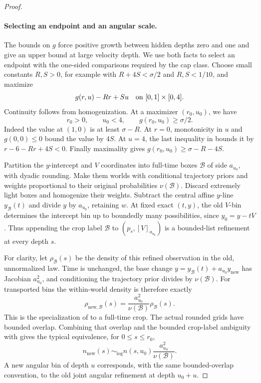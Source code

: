 \begin{proof}
\paragraph{Selecting an endpoint and an angular scale.}
The bounds on \(g\) force positive growth between hidden depths
zero and one and give an upper bound at large velocity depth.
We use both facts to select an endpoint with the one-sided
comparisons required by the cap class.
Choose small constants \(R,S>0\), for example with
\(R+4S<\sigma/2\) and \(R,S<1/10\), and maximize
\begin{equation}
 g(r,u)-Rr+Su
 \quad\hbox{on }[0,1]\times[0,4].
 \label{a01:endpoint-maximization}
\end{equation}
Continuity follows from homogenization.
At a maximizer \((r_0,u_0)\), we have
\begin{equation}
 r_0>0,\qquad u_0<4,\qquad
 g(r_0,u_0)\ge\sigma/2.
 \label{a01:chosen-endpoint}
\end{equation}
Indeed the value at \((1,0)\) is at least \(\sigma-R\).
At \(r=0\), monotonicity in \(u\) and
\(g(0,0)\le0\) bound the value by \(4S\).
At \(u=4\), the last inequality in
 bounds it by
\(r-6-Rr+4S<0\).
Finally maximality gives
\(g(r_0,u_0)\ge\sigma-R-4S\).

Partition the \(y\)-intercept and \(V\) coordinates into
full-time boxes \(\mathcal B\) of side
\(a_{u_0}\), with dyadic rounding.
Make them worlds with conditional trajectory priors
and weights proportional to their original
probabilities \(\nu(\mathcal B)\).
Discard extremely light boxes and homogenize their
weights.
Subtract the central affine \(y\)-line \(y_{\mathcal B}(t)\) and divide
\(y\) by \(a_{u_0}\), retaining \(w\).
At fixed exact \((t,y)\), the old \(V\)-bin determines the
intercept bin up to boundedly many possibilities, since
\(y_0=y-tV\). Thus appending the crop label \(\mathcal B\)
to \((p_s,[V]_{a_{u_0}})\) is a bounded-list refinement at
every depth \(s\).

For clarity, let \(\rho_{\mathcal B}(s)\) be the density of
this refined observation in the old, unnormalized law.
Time is unchanged, the base change
\(y=y_{\mathcal B}(t)+a_{u_0}y_{\mathrm{new}}\) has
Jacobian \(a_{u_0}^2\), and conditioning the trajectory
prior divides by \(\nu(\mathcal B)\). For transported
bins the within-world density is therefore exactly
\[
 \rho_{\mathrm{new},\mathcal B}(s)
 =\frac{a_{u_0}^2}{\nu(\mathcal B)}\rho_{\mathcal B}(s).
\]
This is the specialization of
 to a full-time crop.
The actual rounded grids have bounded overlap. Combining that
overlap and the bounded crop-label ambiguity with
 gives the typical equivalence,
for \(0\le s\le r_0\),
\begin{equation}
 n_{\mathrm{new}}(s)\sim_{\log}
 n(s,u_0)\frac{a_{u_0}^2}{\nu(\mathcal B)}.
 \label{a01:crop-density}
\end{equation}
A new angular bin of depth \(u\) corresponds, with the same
bounded-overlap convention, to the old joint angular refinement
at depth \(u_0+u\).


\end{proof}
